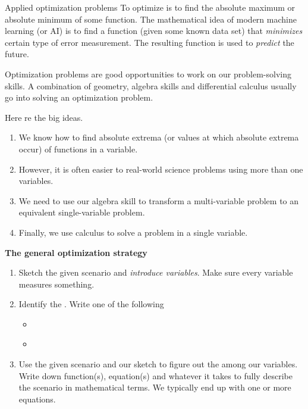 \documentclass[../main.tex]{subfiles}
\begin{document}
\begin{lesson}{Applied optimization problems}
  To optimize is to find the absolute maximum or absolute minimum of some function. The mathematical idea of modern machine learning (or AI) is to find a function (given some known data set) that \emph{minimizes} certain type of error measurement. The resulting function is used to \emph{predict} the future.

  Optimization problems are good opportunities to work on our problem-solving skills. A combination of geometry, algebra skills and differential calculus usually go into solving an optimization problem.

  Here re the big ideas.
  \begin{enumerate}[label=(\alph*)]
    \item We know how to find absolute extrema (or values at which absolute extrema occur) of functions in a  variable.

    \item However, it is often easier to  real-world science problems using more than one variables.

    \item We need to use our algebra skill to transform a multi-variable problem to an equivalent single-variable problem.

    \item Finally, we use calculus to solve a problem in a single variable.
  \end{enumerate}


  \textbf{The general optimization strategy}
  \label{page:optimization-strategy}
  \begin{enumerate}[label=(\arabic*)]
    \item Sketch the given scenario and \emph{introduce variables}. Make sure every variable measures something.

    \item Identify the . Write one of the following
      \begin{itemize}
        \item \emph{}
        \item \emph{}
      \end{itemize}

    \item Use the given scenario and our sketch to figure out the  among our variables. Write down function(s), equation(s) and whatever it takes to fully describe the scenario in mathematical terms. We typically end up with one or more equations. 


\end{enumerate}
\end{lesson}
\end{document}
